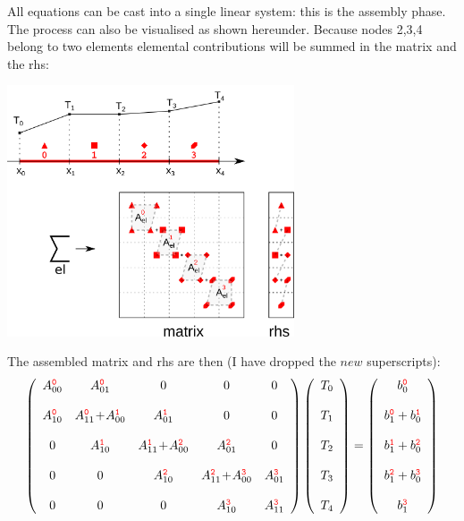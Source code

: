 All equations can be cast into a single linear system: this is the {\color{olive} assembly} phase.
The process can also be visualised as shown hereunder. Because nodes 2,3,4 belong to two elements 
elemental contributions will be summed in the matrix and the rhs:
\begin{center}
\includegraphics[width=8.5cm]{images/oneD/assembly}
\end{center}
The assembled matrix and rhs are then (I have dropped the $new$ superscripts):
\[
\left(
\begin{array}{ccccc}
A_{00}^{{\color{red}\tt 0}} &  A_{01}^{{\color{red}\tt 0}} &0&0&0 \\ \\ 
A_{10}^{{\color{red}\tt 0}} &  A_{11}^{{\color{red} \tt 0}} \!+\! A_{00}^{{\color{red}\tt 1}}  & A_{01}^{{\color{red}\tt 1}}   &0&0 \\ \\
0& A_{10}^{{\color{red}\tt 1}} & A_{11}^{{\color{red} \tt 1}} \! +\! A_{00}^{{\color{red}\tt 2}}  & A_{01}^{{\color{red}\tt 2}}   & 0\\ \\
0&0& A_{10}^{{\color{red}\tt 2}}   & A_{11}^{{\color{red}\tt 2}} \! +\! A_{00}^{{\color{red}\tt 3}}   & A_{01}^{{\color{red}\tt 3}}  \\ \\
0&0&0& A_{10}^{{\color{red}\tt 3}}   & A_{11}^{{\color{red}\tt 3}} 
\end{array}
\right)
\left(
\begin{array}{c}
T_0 \\\\ T_1 \\\\ T_2 \\\\ T_3 \\\\ T_4
\end{array}
\right)
=
\left(
\begin{array}{c}
b_{0}^{{\color{red}\tt 0}} \\ \\
b_{1}^{{\color{red}\tt 0}} + b_{0}^{{\color{red}\tt 1}}\\ \\
b_{1}^{{\color{red}\tt 1}} + b_{0}^{{\color{red}\tt 2}}\\ \\
b_{1}^{{\color{red}\tt 2}} + b_{0}^{{\color{red}\tt 3}}\\ \\
b_{1}^{{\color{red}\tt 3}} 
\end{array}
\right)
\]
